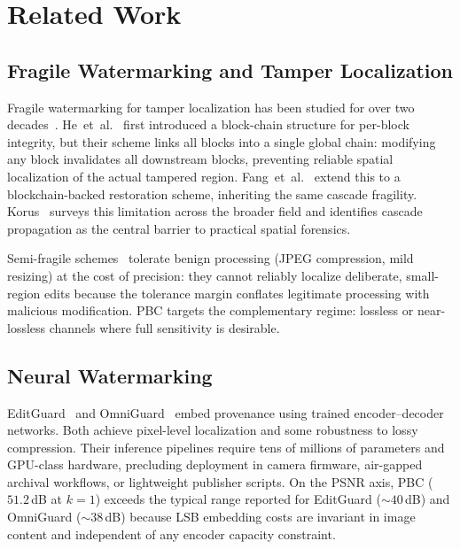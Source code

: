 \documentclass[conference]{IEEEtran}
\begin{document}
\section{Related Work}
\label{sec:related}

\subsection{Fragile Watermarking and Tamper Localization}

Fragile watermarking for tamper localization has been studied for
over two decades~\cite{cox2007watermarking}. He~et~al.~\cite{he2008blockchain}
first introduced a block-chain structure for per-block integrity, but
their scheme links all blocks into a single global chain: modifying any
block invalidates all downstream blocks, preventing reliable spatial
localization of the actual tampered region. Fang~et~al.~\cite{fang2020blockchain}
extend this to a blockchain-backed restoration scheme, inheriting the
same cascade fragility. Korus~\cite{korus2017survey} surveys this
limitation across the broader field and identifies cascade propagation as
the central barrier to practical spatial forensics.

Semi-fragile schemes~\cite{lin2001semifragile} tolerate benign
processing (JPEG compression, mild resizing) at the cost of precision:
they cannot reliably localize deliberate, small-region edits because the
tolerance margin conflates legitimate processing with malicious
modification. PBC targets the complementary regime: lossless or
near-lossless channels where full sensitivity is desirable.

\subsection{Neural Watermarking}

EditGuard~\cite{editguard} and OmniGuard~\cite{omniguard} embed
provenance using trained encoder--decoder networks. Both achieve
pixel-level localization and some robustness to lossy compression. Their
inference pipelines require tens of millions of parameters and
GPU-class hardware, precluding deployment in camera firmware,
air-gapped archival workflows, or lightweight publisher scripts. On the
PSNR axis, PBC ($51.2$\,dB at $k{=}1$) exceeds the typical range
reported for EditGuard (${\sim}40$\,dB) and OmniGuard (${\sim}38$\,dB)
because LSB embedding costs are invariant in image content and
independent of any encoder capacity constraint.
\end{document}
